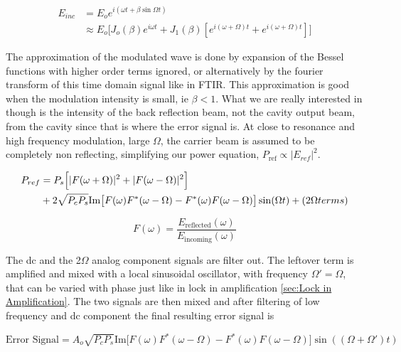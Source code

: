\documentclass[11pt,a4paper]{book}
\begin{document}
		\begin{equation}
			\begin{split}
			E_{inc} & = E_o e^{i(\omega t + \beta\sin{\Omega t})}\\
			& \approx E_o \Big[J_o(\beta) e^{i\omega t} 
			+J_1(\beta)[e^{i(\omega +\Omega)t} +e^{i(\omega + \Omega)t}]\Big]
			\end{split}
		\end{equation}
		
		The approximation of the modulated wave is done by expansion of the Bessel functions with higher order terms ignored, or alternatively by the fourier transform of this time domain signal like in FTIR. This approximation is good when the modulation intensity is small, ie $\beta < 1$. What we are really interested in though is the intensity of the back reflection beam, not the cavity output beam, from the cavity since that is where the error signal is. At close to resonance and high frequency modulation, large $\Omega$, the carrier beam is assumed to be completely non reflecting, simplifying our power equation, $P_{\text{ref}}\propto |E_{ref}|^2$.
		
		\begin{equation}
			\begin{split}
			P_{ref} & = P_s\Big[|F(\omega +\Omega)|^2+|F(\omega -\Omega)|^2\Big]\\
			& + 2\sqrt{P_c P_s} \space \text{Im}  \big[ F(\omega)F^*(\omega - \Omega)-F^*(\omega) F(\omega - \Omega) \big]\sin (\Omega t)+(2\Omega terms)\\
			\end{split}
		\end{equation}
		
		\begin{equation}
			F(\omega)=\frac{E_\text{reflected}(\omega)}{E_\text{incoming}(\omega)}
		\end{equation}
		
		The dc and the 2$\Omega$ analog component signals are filter out. The leftover term is amplified and mixed with a local sinusoidal oscillator, with frequency $\Omega' = \Omega$, that can be varied with phase just like in lock in amplification \autoref{sec:Lock in Amplification}. The two signals are then mixed and after filtering of low frequency and dc component the final resulting error signal is
		
		\begin{equation}
			\text{Error Signal}= A_o \sqrt{P_c P_s} \text{Im}\big[F(\omega)F^*(\omega - \Omega)-F^*(\omega) F(\omega - \Omega) \big]\sin((\Omega + \Omega')t)
		\end{equation}
%
		
\end{document}
